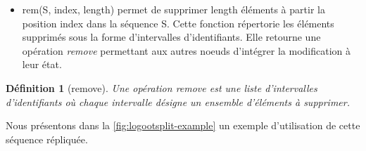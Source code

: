 \documentclass[12pt]{thesul}
\newtheorem{definition}{Définition}
\begin{document}
\begin{itemize}
  \item rem(S, index, length) permet de supprimer length éléments à partir la position index dans la séquence S.
  Cette fonction répertorie les éléments supprimés sous la forme d'intervalles d'identifiants.
  Elle retourne une opération \emph{remove} permettant aux autres noeuds d'intégrer la modification à leur état.
\end{itemize}

\begin{definition}[remove]
  Une opération \emph{remove} est une liste d'intervalles d'identifiants où chaque intervalle désigne un ensemble d'éléments à supprimer.
\end{definition}

Nous présentons dans la \autoref{fig:logootsplit-example} un exemple d'utilisation de cette séquence répliquée.
\end{document}
